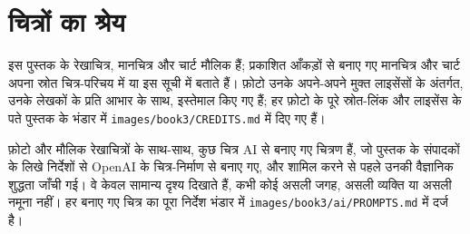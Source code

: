 \chapter*{चित्रों का श्रेय}

इस पुस्तक के रेखाचित्र, मानचित्र और चार्ट मौलिक हैं; प्रकाशित आँकड़ों से बनाए गए मानचित्र और
चार्ट अपना स्रोत चित्र-परिचय में या इस सूची में बताते हैं। फ़ोटो उनके अपने-अपने मुक्त लाइसेंसों के
अंतर्गत, उनके लेखकों के प्रति आभार के साथ, इस्तेमाल किए गए हैं; हर फ़ोटो के पूरे स्रोत-लिंक और
लाइसेंस के पते पुस्तक के भंडार में \texttt{images/book3/CREDITS.md} में दिए गए हैं।

\bigskip
फ़ोटो और मौलिक रेखाचित्रों के साथ-साथ, कुछ चित्र AI से बनाए गए चित्रण हैं, जो पुस्तक के
संपादकों के लिखे निर्देशों से OpenAI के चित्र-निर्माण से बनाए गए, और शामिल करने से पहले उनकी
वैज्ञानिक शुद्धता जाँची गई। वे केवल सामान्य दृश्य दिखाते हैं, कभी कोई असली जगह, असली व्यक्ति
या असली नमूना नहीं। हर बनाए गए चित्र का पूरा निर्देश भंडार में
\texttt{images/book3/ai/PROMPTS.md} में दर्ज है।


